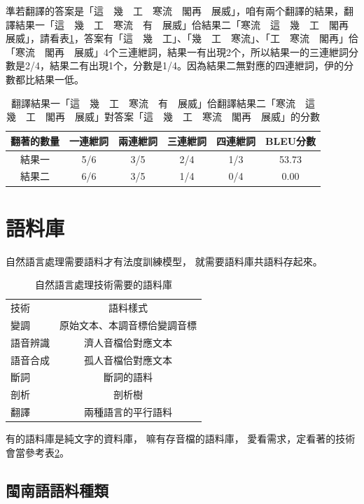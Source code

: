 準若翻譯的答案是「這　幾　工　寒流　閣再　展威」，咱有兩个翻譯的結果，翻譯結果一「這　幾　工　寒流　有　展威」佮結果二「寒流　這　幾　工　閣再　展威」，請看表\ref{表：範例BLEU分數}，答案有「這　幾　工」、「幾　工　寒流」、「工　寒流　閣再」佮「寒流　閣再　展威」4个三連紲詞，結果一有出現2个，所以結果一的三連紲詞分數是2/4，結果二有出現1个，分數是1/4。因為結果二無對應的四連紲詞，伊的分數都比結果一低。

\begin{table}
\caption{翻譯結果一「這　幾　工　寒流　有　展威」佮翻譯結果二「寒流　這　幾　工　閣再　展威」對答案「這　幾　工　寒流　閣再　展威」的分數}%
\label{表：範例BLEU分數}
\centering
\begin{tabular}{|c|cccc|c|}
\hline
翻著的數量 & 一連紲詞 & 兩連紲詞 & 三連紲詞 & 四連紲詞 & BLEU分數\\
\hline
結果一 & 5/6 & 3/5 & 2/4 & 1/3 & 53.73\\
\hline
結果二 & 6/6 & 3/5 & 1/4 & 0/4 & 0.00\\
\hline
\end{tabular}
\end{table}


\section{語料庫}
\label{節：語料庫}
自然語言處理需要語料才有法度訓練模型，
就需要語料庫共語料存起來。

\begin{table}
\caption{自然語言處理技術需要的語料庫}
\label{表：自然語言處理技術需要的語料庫}
\centering
\begin{tabular}{lc}
技術 & 語料樣式 \\
變調 & 原始文本、本調音標佮變調音標 \\
語音辨識 & 濟人音檔佮對應文本 \\
語音合成 & 孤人音檔佮對應文本 \\
斷詞 & 斷詞的語料 \\
剖析 & 剖析樹 \\
翻譯 & 兩種語言的平行語料 \\
\end{tabular}
\end{table}

有的語料庫是純文字的資料庫，
嘛有存音檔的語料庫，
愛看需求，定看著的技術會當參考表\ref{表：自然語言處理技術需要的語料庫}。

\subsection{閩南語語料種類}
\label{節：閩南語語料種類}

